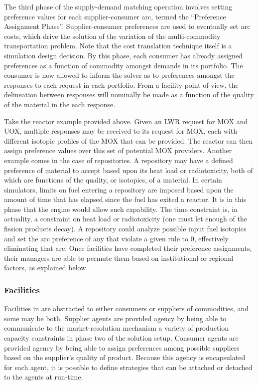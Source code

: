 The third phase of the supply-demand matching operation involves setting
preference values for each supplier-consumer arc, termed the ``Preference
Assignment Phase''. Supplier-consumer preferences are used to eventually set arc
costs, which drive the solution of the variation of the multi-commodity
transportation problem. Note that the cost translation technique itself is a
simulation design decision. By this phase, each consumer has already assigned
preferences as a function of commodity amongst demands in its portfolio. The
consumer is now allowed to inform the solver as to preferences amongst the
responses to each request in each portfolio. From a facility point of view, the
delineation between responses will nominally be made as a function of the
quality of the material in the each response. 

Take the reactor example provided above. Given an LWR request for MOX and UOX,
multiple responses may be received to its request for MOX, each with different
isotopic profiles of the MOX that can be provided. The reactor can then assign
preference values over this set of potential MOX providers. Another example
comes in the case of repositories. A repository may have a defined preference of
material to accept based upon its heat load or radiotoxicity, both of which are
functions of the quality, or isotopics, of a material. In certain simulators,
limits on fuel entering a repository are imposed based upon the amount of time
that has elapsed since the fuel has exited a reactor. It is in this phase that
the \Cyclus engine would allow such capability. The time constraint is, in
actuality, a constraint on heat load or radiotoxicity (one must let enough of
the fission products decay). A repository could analyze possible input fuel
isotopics and set the arc preference of any that violate a given rule to 0,
effectively eliminating that arc. Once facilities have completed their
preference assignments, their managers are able to permute them based on
institutional or regional factors, as explained below.

\subsubsection{Facilities}

Facilities in \Cyclus are abstracted to either consumers or suppliers of
commodities, and some may be both. Supplier agents are provided agency by being
able to communicate to the market-resolution mechanism a variety of production
capacity constraints in phase two of the solution setup. Consumer agents are
provided agency by being able to assign preferences among possible suppliers
based on the supplier's quality of product. Because this agency is encapsulated
for each agent, it is possible to define strategies that can be attached or
detached to the agents at run-time. 

